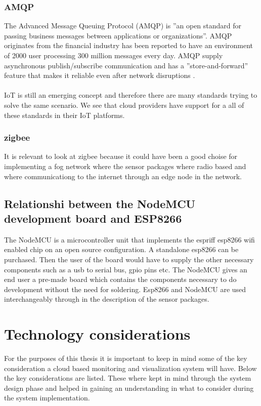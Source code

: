 \documentclass[]{uiophd}
\begin{document}
\subsection{AMQP}
The Advanced Message Queuing Protocol (AMQP) is ''an open standard for passing business messages between applications or organizations''\parencite{amqp}. AMQP originates from the financial industry has been reported to have an environment of 2000 user processing 300 million messages every day. AMQP supply asynchronous publish/subscribe communication and has a ''store-and-forward'' feature that makes it reliable even after network disruptions \parencite{karagiannis2015survey}. 
\\\\
IoT is still an emerging concept and therefore there are many standards trying to solve the same scenario. We see that cloud providers have support for a all of these standards in their IoT platforms.

\subsection{zigbee}
It is relevant to look at zigbee because it could have been a good choise for implementing a fog network where the sensor packages where radio based and where communicationg to the internet through an edge node in the network.

\section{Relationshi between the NodeMCU development board and ESP8266}
The NodeMCU is a microcontroller unit that implements the espriff esp8266 wifi enabled chip on an open source configuration. A standalone esp8266 can be purchased. Then the user of the board would have to supply the other necessary components such as a usb to serial bus, gpio pins etc. The NodeMCU gives an end user a pre-made board which contains the components necessary to do development without the need for soldering. Esp8266 and NodeMCU are used interchangeably through in the description of the sensor packages.

\chapter{Technology considerations}


For the purposes of this thesis it is important to keep in mind some of the key consideration a cloud based monitoring and visualization system will have. Below the key considerations are listed. These where kept in mind through the system design phase and helped in gaining an understanding in what to consider during the system implementation.
\end{document}
